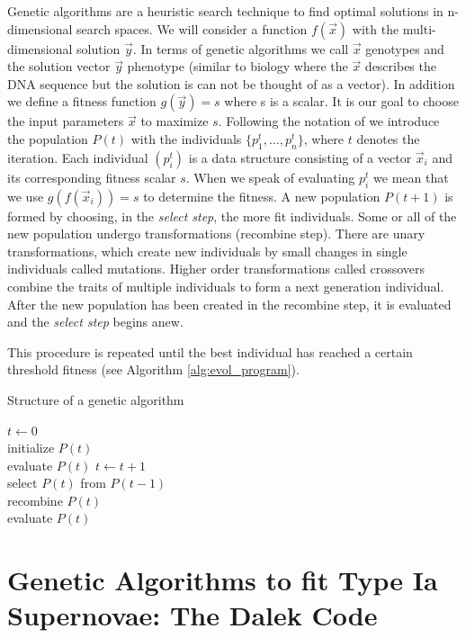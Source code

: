 Genetic algorithms are a heuristic search technique to find optimal solutions in n-dimensional search spaces. We will consider a function $f(\vec{x})$ with the multi-dimensional solution $\vec{y}$. In terms of genetic algorithms we call $\vec{x}$ genotypes and the solution vector $\vec{y}$ phenotype (similar to biology where the $\vec{x}$ describes the DNA sequence but the solution is can not be thought of as a vector). In addition we define a fitness function $g(\vec{y})=s$ where s is a scalar. It is our goal to choose the input parameters $\vec{x}$  to maximize $s$. 
Following the notation of \citep{Michalewicz:1994:GAD:184675} we introduce the population $P(t)$ with the individuals $\{p_{1}^{t}, \dots, p_{n}^{t}\}$, where $t$ denotes the iteration. Each individual $(p_{i}^t)$ is a data structure consisting of a vector $\vec{x}_i$ and its corresponding fitness scalar $s$.  When we speak of evaluating $p_{i}^{t}$ we mean that we use $g(f(\vec{x}_i))=s$ to determine the fitness. A new population $P(t+1)$ is formed by choosing,  in the \textit{select step}, the more fit individuals. Some or all of the new population undergo transformations (recombine step). There are unary transformations, which create new individuals by small changes in single individuals called mutations. Higher order transformations called crossovers combine the traits of multiple individuals to form a next generation individual. 
After the new population has been created in the recombine step, it is evaluated and the \textit{select step} begins anew. 

This procedure is repeated until the best individual has reached a certain threshold fitness (see Algorithm \ref{alg:evol_program}). 

\begin{algorithm}
\label{alg:evol_program}
\caption{Structure of a genetic algorithm}
\begin{algorithmic}
\STATE $t \gets 0$\\
initialize $P(t)$\\
evaluate $P(t)$
\STATE $t \gets t+1$\\
select $P(t)$ from $P(t-1)$\\
recombine $P(t)$\\
evaluate $P(t)$
\ENDWHILE
\end{algorithmic}
\end{algorithm}




\section{Genetic Algorithms to fit Type Ia Supernovae: The Dalek Code}








